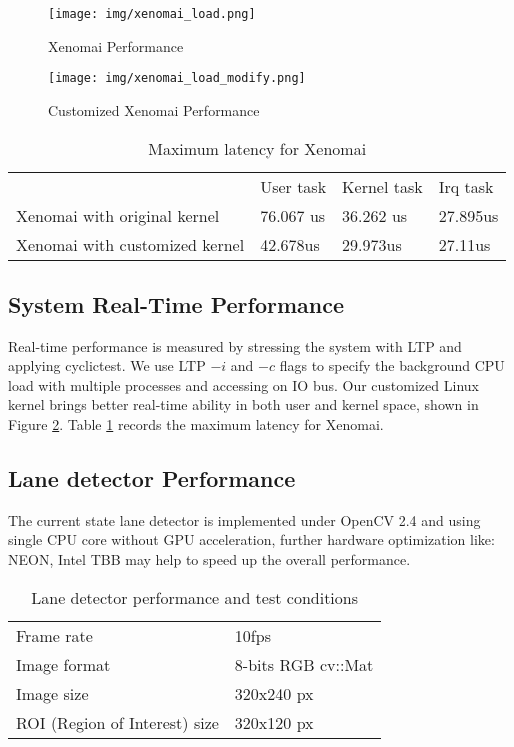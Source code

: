 \documentclass[conference]{IEEEtran}
\begin{document}
\begin{figure}	
	\centering
	\texttt{[image: img/xenomai\_load.png]}
	\caption{Xenomai Performance}
	\label{fig:xeno_perf}
\end{figure}

\begin{figure}
	\centering
	\texttt{[image: img/xenomai\_load\_modify.png]}
	\caption{Customized Xenomai Performance}
	\label{fig:xeno_perf_modify}
\end{figure}

\begin{table}[]
\centering
\caption{Maximum latency for Xenomai}
\label{xeno_compare}
\begin{tabular}{llll}
                              & User task & Kernel task & Irq task \\
Xenomai with original kernel  & 76.067 us & 36.262 us   & 27.895us \\
Xenomai with customized kernel & 42.678us  & 29.973us    & 27.11us 
\end{tabular}
\end{table}

\subsection{System Real-Time Performance}

Real-time performance is measured by stressing the system with LTP and applying cyclictest. \cite{cyclictest} We use LTP $-i$ and $-c$ flags to specify the background CPU load with multiple processes and accessing on IO bus. Our customized Linux kernel brings better real-time ability in both user and kernel space, shown in Figure \ref{fig:xeno_perf_modify}. Table \ref{xeno_compare} records the maximum latency for Xenomai.

\subsection{Lane detector Performance}

The current state lane detector is implemented under OpenCV 2.4 and using single CPU core without GPU acceleration, further hardware optimization like: NEON, Intel TBB may help to speed up the overall performance.

\begin{table}[!htbp]
	\centering
	\caption{Lane detector performance and test conditions}
	\label{lane_detector_condition}
	\begin{tabular}{ll}
		Frame rate                      &10fps \\
		Image format                    &8-bits RGB cv::Mat \\
		Image size                      &320x240 px	 \\	
		ROI (Region of Interest) size   &320x120 px
	\end{tabular}
\end{table}
\end{document}
